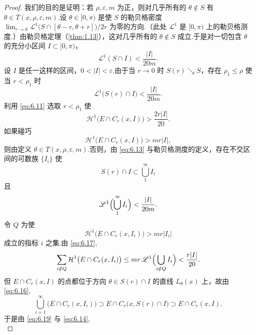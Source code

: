 \begin{proof}
我们的目的是证明：若 $\rho,\varepsilon,m$ 为正，则对几乎所有的 $\theta\notin S$ 有 $\theta\in T(x,\rho,\varepsilon,m)$.设 $\theta\in[0,\pi)$ 是使 $S$ 的勒贝格密度 $\lim_{r\to 0}\mathscr{L}^1\bigl(S\cap[\theta-r,\theta+r]\bigr)/2r$ 为零的方向.（此处 $\mathscr{L}^1$ 是 $[0,\pi)$ 上的勒贝格测度.）由勒贝格定理（\cref{thm:1.13}），这对几乎所有的 $\theta\notin S$ 成立.于是对一切包含 $\theta$ 的充分小区间 $I\subset[0,\pi)$，
\begin{equation}\label{eq:6.12}
  \mathscr{L}^{1}(S\cap I)<\frac{|I|}{20m}.
\end{equation}
设 $I$ 是任一这样的区间，$0<|I|<\varepsilon$.由于当 $r\to 0$ 时 $S(r)\searrow S$，存在 $\rho_1\leq\rho$ 使当 $r<\rho_1$ 时
\begin{equation}\label{eq:6.13}
  \mathscr{L}^{1}\bigl(S(r)\cap I\bigr)<\frac{|I|}{20m}.
\end{equation}
利用 \eqref{eq:6.11} 选取 $r<\rho_1$ 使
\begin{equation}\label{eq:6.14}
  \mathcal{H}^{1}\bigl(E\cap C_r(x,I)\bigr)>\frac{2r|I|}{20}.
\end{equation}
如果碰巧
\begin{equation}\label{eq:6.15}
  \mathcal{H}^{1}\bigl(E\cap C_r(x,I)\bigr)>mr|I|,
\end{equation}
则由定义 $\theta\in T(x,\rho,\varepsilon,m)$.否则，由 \eqref{eq:6.13} 与勒贝格测度的定义，存在不交区间的可数族 $\{I_i\}$ 使
\begin{equation}\label{eq:6.16}
  S(r)\cap I\subset\bigcup_{1}^{\infty}I_i
\end{equation}
且
\begin{equation}\label{eq:6.17}
  \mathscr{L}^{1}\Bigl(\bigcup_{1}^{\infty}I_i\Bigr)<\frac{|I|}{20m}.
\end{equation}
令 $Q$ 为使
\begin{equation}\label{eq:6.18}
  \mathcal{H}^{1}\bigl(E\cap C_r(x,I_i)\bigr)>mr|I_i|
\end{equation}
成立的指标 $i$ 之集.由 \eqref{eq:6.17},
\begin{equation}\label{eq:6.19}
  \sum_{i\notin Q}\mathcal{H}^{1}\bigl(E\cap C_r(x,I_i)\bigr)
  \leq mr\,\mathscr{L}^{1}\Bigl(\bigcup_{i\notin Q}I_i\Bigr)
  <\frac{r|I|}{20}.
\end{equation}
但 $E\cap C_r(x,I)$ 的点都位于方向 $\theta\in S(r)\cap I$ 的直线 $L_\theta(x)$ 上，故由 \eqref{eq:6.16},
\[
  \bigcup_{i=1}^{\infty}\bigl(E\cap C_r(x,I_i)\bigr)\supset E\cap C_r\bigl(x,S(r)\cap I\bigr)\supset E\cap C_r(x,I).
\]
于是由 \eqref{eq:6.19} 与 \eqref{eq:6.14},
\begin{equation}\label{eq:6.20}

\end{equation}
\end{proof}

